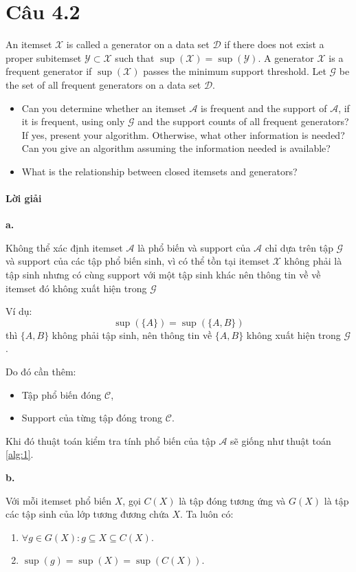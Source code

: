 \section{Câu 4.2}
An itemset $\mathcal{X}$ is called a generator on a data set $\mathcal{D}$ if there does not exist a proper subitemset $\mathcal{Y} \subset \mathcal{X}$ such that $\sup(\mathcal{X}) = \sup(\mathcal{Y})$. A generator $\mathcal{X}$ is a frequent generator if $\sup(\mathcal{X})$ passes the minimum support threshold. Let $\mathcal{G}$ be the set of all frequent generators on a data set $\mathcal{D}$.

\begin{itemize}
    \item[a.] Can you determine whether an itemset $\mathcal{A}$ is frequent and the support of $\mathcal{A}$, if it is frequent, using only $\mathcal{G}$ and the support counts of all frequent generators? If yes, present your algorithm. Otherwise, what other information is needed? Can you give an algorithm assuming the information needed is available?
    \item[b.] What is the relationship between closed itemsets and generators?
\end{itemize}

\pagebreak

\paragraph{Lời giải}

\noindent \textbf{a.}

Không thể xác định itemset $\mathcal{A}$ là phổ biến và support của $\mathcal{A}$ chỉ dựa trên tập $\mathcal{G}$ và support của các tập phổ biến sinh, vì có thể tồn tại itemset $\mathcal{X}$ không phải là tập sinh nhưng có cùng support với một tập sinh khác nên thông tin về về itemset đó không xuất hiện trong $\mathcal{G}$

Ví dụ:
\[
    \sup(\{A\})=\sup(\{A,B\})
\]
thì $\{A,B\}$ không phải tập sinh, nên thông tin về $\{A,B\}$ không xuất hiện trong $\mathcal{G}$.

Do đó cần thêm:
\begin{itemize}
    \item Tập phổ biến đóng $\mathcal{C}$,
    \item Support của từng tập đóng trong $\mathcal{C}$.
\end{itemize}

Khi đó thuật toán kiểm tra tính phổ biến của tập $\mathcal{A}$ sẽ giống như thuật toán \ref{alg:1}.

\bigskip

\noindent \textbf{b.}

Với mỗi itemset phổ biến $X$, gọi $C(X)$ là tập đóng tương ứng và $G(X)$ là tập các tập sinh của lớp tương đương chứa $X$. Ta luôn có:
\begin{enumerate}
    \item $\forall g \in G(X): g \subseteq X \subseteq C(X)$.
    \item $\sup(g) = \sup(X) = \sup(C(X))$.
\end{enumerate}